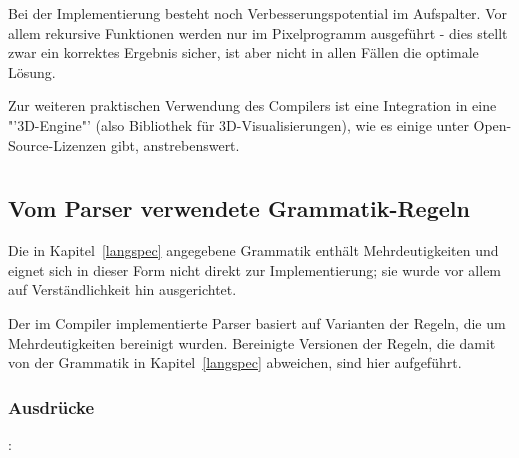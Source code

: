 \documentclass[twoside,a4paper,fleqn,12pt]{book}
\begin{document}
Bei der Implementierung besteht noch Verbesserungspotential im Aufspalter. 
Vor allem rekursive Funktionen werden nur im Pixelprogramm ausgeführt - dies stellt zwar ein korrektes
Ergebnis sicher, ist aber nicht in allen Fällen die optimale Lösung.


Zur weiteren praktischen Verwendung des Compilers ist eine Integration in eine "'3D-Engine"' (also Bibliothek für 3D-Visualisierungen), wie es einige
unter Open-Source-Lizenzen gibt, anstrebenswert.

\cleardoublepage
\appendix

\chapter[Anhang]{}

\section{Vom Parser verwendete Grammatik-Regeln}
\label{grammar_fixes}

Die in Kapitel~\ref{langspec} angegebene Grammatik enthält Mehrdeutigkeiten und eignet sich in dieser Form nicht direkt zur Implementierung;
sie wurde vor allem auf Verständlichkeit hin ausgerichtet.

Der im Compiler implementierte Parser basiert auf Varianten der Regeln, die um Mehrdeutigkeiten bereinigt wurden.
Bereinigte Versionen der Regeln, die damit von der Grammatik in Kapitel~\ref{langspec} abweichen, sind hier aufgeführt. 

\subsection{Ausdrücke}
:\label{ORIG_ausdruck}\\
\hspace*{1cm} \Gspace{}\\
\end{document}
